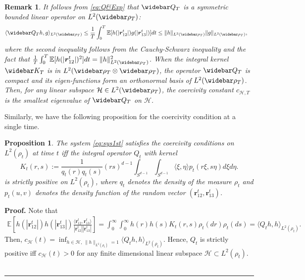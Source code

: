 \documentclass[]{elsarticle}
\def\R{\mathbb{R}}
\def\E{\mathbb{E}}
\newcommand{\wbar}\widebar
\newcommand{\mbf}[1]{\boldsymbol{#1}}
\newcommand{\innerp}[2]{\langle #1,#2 \rangle}
\newcommand{\br}{\mbf{r}}
\newcommand{\hypspace}{\mathcal{H}}
\newtheorem{proposition}[theorem]{Proposition}
\newtheorem{remark}[theorem]{Remark}
\newenvironment{proof}[1][Proof]{\noindent\textbf{#1.} }{\ \rule{0.5em}{0.5em}}
\numberwithin{equation}{section}
\numberwithin{theorem}{section}
\begin{document}
\begin{remark} \label{rmk_compact}
It follows from \eqref{eq:Q&Exp} that $\wbar Q_T$ is a symmetric bounded linear operator on $L^2(\wbar \rho_T)$:
\begin{align*}
\langle \wbar Q_T h, g\rangle_{L^2(\wbar \rho_T)} %
 & \leq  \frac{1}{T}\int_{0}^T \E[h(|\br_{12}^t|)g(|\br_{13}^t|)] dt  
 \leq \|h\|_{L^2(\wbar \rho_T)} \|g\|_{L^2(\wbar \rho_T)},
\end{align*} 
where the second inequality follows from the Cauchy-Schwarz inequality and the fact that $\frac{1}{T}\int_0^T \E[h(|\br_{12}^t|)^2]dt = \|h\|_{L^2(\wbar \rho_T)}^2$. When the integral kernel $\wbar K_T$ is in $L^2(\wbar \rho_T\otimes \wbar \rho_T)$, the operator $\wbar Q_T$ is compact and its eigen-functions  form an orthonormal basis of $L^2(\wbar \rho_T)$. %
Then, for any linear subspace $\hypspace\in L^2(\wbar\rho_T)$, the coercivity constant $c_{\hypspace,T}$ is the smallest eigenvalue of $\wbar Q_T$ on $\hypspace$. 
\end{remark}

Similarly, we have the following proposition for the coercivity condition at a single time. 
\begin{proposition}\label{prop.cc2PD_t}
The system \eqref{eq:sys1st} satisfies the coercivity conditions on $L^2(\rho_t)$ at time $t$ iff the integral operator $Q_t$ with  kernel 
 \begin{equation} \label{eq:kernelK_t}
K_t(r, s) := \frac{1}{q_t(r) q_t(s)} (rs)^{d-1}\int_{S^{d-1}}\int_{S^{d-1}}\innerp{\xi}{\eta} p_t(r\xi,s\eta) d\xi d\eta.
 \end{equation} 
 is strictly positive on $L^2(\rho_t)$, where $q_t$ denotes the density of the measure $\rho_t$ and $p_t(u,v)$ denotes the density function of the random vector $(\br_{12}^t, \br_{13}^t)$.
\end{proposition}
\begin{proof}
Note that 
\begin{align}\label{Q_tExp}
\E[h(|\br_{12}^t|)h(|\br_{13}^t|)\frac{\innerp{\br_{12}^t}{\br_{13}^t}}{|\br_{12}^t||\br_{13}^t|}]  =
\int_0^\infty \int_0^\infty h(r)h(s)  K_t(r,s)\rho_t(dr) \rho_t(ds) = \langle Q_t h, h\rangle_{L^2(\rho_t)}. 
\end{align}
Then, $c_\hypspace(t) = \inf_{h\in  \mathcal{H}, \, \|h\|_{L^2(\rho_t)}=1} \langle Q_t h, h\rangle_{L^2(\rho_t)}$. Hence, $Q_t$ is strictly positive iff $c_\hypspace(t) >0$ for any finite dimensional linear subspace $\mathcal{H}  \subset L^2(\rho_t)$. 
 \end{proof}
 
\end{document}
